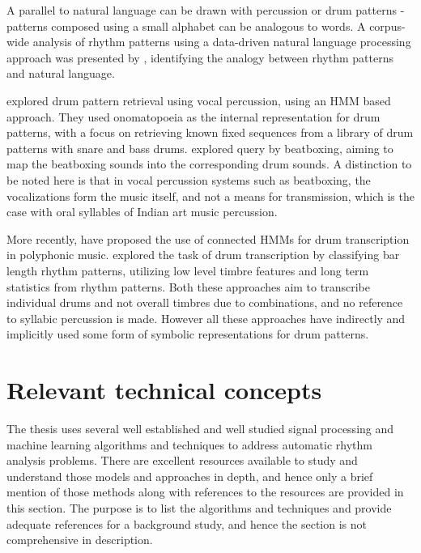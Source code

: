 A parallel to natural language can be drawn with percussion or drum patterns - patterns composed using a small alphabet can be analogous to words. A corpus-wide analysis of rhythm patterns using a data-driven natural language processing approach was presented by , identifying the analogy between rhythm patterns and natural language. 

 explored drum pattern retrieval using vocal percussion, using an \gls{HMM} based approach. They used onomatopoeia as the internal representation for drum patterns, with a focus on retrieving known fixed sequences from a library of drum patterns with snare and bass drums.  explored query by beatboxing, aiming to map the beatboxing sounds into the corresponding drum sounds. A distinction to be noted here is that in vocal percussion systems such as beatboxing, the vocalizations form the music itself, and not a means for transmission, which is the case with oral syllables of Indian art music percussion. 

More recently,  have proposed the use of connected \glspl{HMM} for drum transcription in polyphonic music.  explored the task of drum transcription by classifying bar length rhythm patterns, utilizing low level timbre features and long term statistics from rhythm patterns. Both these approaches aim to transcribe individual drums and not overall timbres due to combinations, and no reference to syllabic percussion is made. However all these approaches have indirectly and implicitly used some form of symbolic representations for drum patterns. %
\section{Relevant technical concepts}\label{sec:bkgnd:techconcepts} %
The thesis uses several well established and well studied signal processing and machine learning algorithms and techniques to address automatic rhythm analysis problems. There are excellent resources available to study and understand those models and approaches in depth, and hence only a brief mention of those methods along with references to the resources are provided in this section. The purpose is to list the algorithms and techniques and provide adequate references for a background study, and hence the section is not comprehensive in description. 
